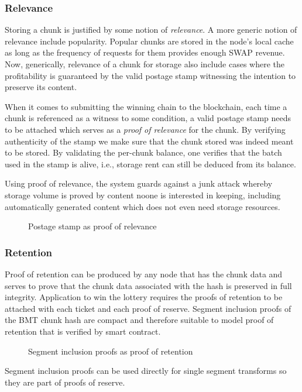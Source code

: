      
\subsubsection{Relevance}
              
Storing a chunk is justified by some notion of \emph{relevance}.     A more generic notion of relevance include popularity. Popular chunks are stored in the node's local cache as long as the frequency of requests for them provides enough SWAP revenue. Now, generically, relevance of  a chunk for storage also include cases where the profitability is guaranteed by the valid postage stamp  witnessing the intention to preserve its content.


When it comes to submitting the winning chain to the blockchain, each time a chunk is referenced as a witness to some condition, a valid postage stamp needs to be attached which serves as a \emph{proof of relevance} for the chunk. By verifying authenticity of the stamp we make sure that the chunk stored was indeed meant to be stored. By validating the per-chunk balance, one verifies that the batch used in the stamp is alive, i.e., storage rent can still be deduced from its balance. 

Using proof of relevance, the system guards against a junk attack whereby storage volume is proved by content noone is interested in keeping, including automatically generated content which does not even need storage resources.

\begin{figure}[htbp]
  \centering
  \caption{Postage stamp as proof of relevance} 
\label{fig:postage-stamp-relevance}
\end{figure}


\subsubsection{Retention} 

Proof of retention can be produced by any node that has the chunk data and serves to prove that the chunk data associated with the hash is preserved in full integrity. Application to win the lottery requires the proofs of retention to be attached with each ticket and each proof of reserve. Segment inclusion proofs of the BMT chunk hash are compact and therefore suitable to model proof of retention that is verified by smart contract. 


\begin{figure}[htbp]
  \centering
  \caption{Segment inclusion proofs as proof of retention}
\label{fig:sip}
\end{figure}


Segment inclusion proofs can be used directly for single segment transforms so they are part of proofs of reserve. 
